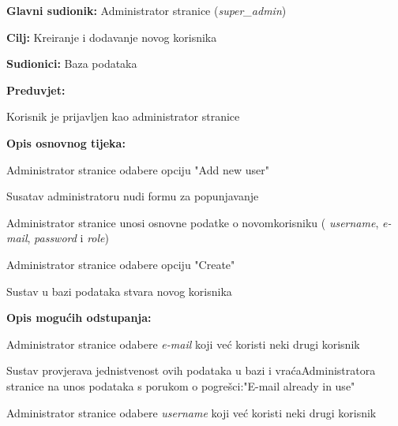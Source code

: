 					\noindent {}
				\begin{packed_item}
					
					\item \textbf{Glavni sudionik: }Administrator stranice (\textit{super\_admin})
					\item  \textbf{Cilj: }Kreiranje i dodavanje novog korisnika
					\item  \textbf{Sudionici: }Baza podataka
					\item  \textbf{Preduvjet: }
					\begin{packed_enum}
						\item Korisnik je prijavljen kao administrator stranice	\end{packed_enum}
					\item  \textbf{Opis osnovnog tijeka: }
					
					\item[] \begin{packed_enum}
						
						\item Administrator stranice odabere opciju "Add new user" 
						\item Susatav administratoru nudi formu za popunjavanje
						\item Administrator stranice unosi osnovne podatke o novom\newline korisniku (\textit{ username}, \textit{e-mail}, \textit{password} i \textit{role})
						\item Administrator stranice odabere opciju "Create"
						\item Sustav u bazi podataka stvara novog korisnika
						
					\end{packed_enum}
					
					\item  \textbf{Opis mogućih odstupanja: }
					
					\item[] \begin{packed_enum}
						
						\item[1] Administrator stranice odabere \textit{e-mail}  koji već koristi neki drugi korisnik
						\item[ ] \begin{packed_enum}
							
							\item[1.1] Sustav provjerava jednistvenost ovih podataka u bazi i vraća\newline Administratora stranice na unos podataka s porukom o pogrešci:\newline "E-mail already in use"
						\end{packed_enum}
					\item[2] Administrator stranice odabere \textit{username} koji već koristi neki drugi korisnik
					\item[ ] \begin{packed_enum}
						

\end{packed_enum}
\end{packed_enum}
\end{packed_item}
